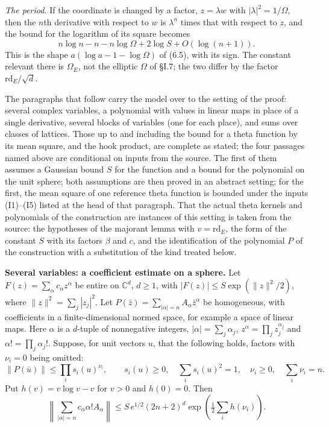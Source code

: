 \documentclass[11pt,letterpaper]{article}
\begin{document}
\emph{The period.} If the coordinate is changed by a factor, $z=\lambda w$ with $|\lambda|^2=1/\Omega$, then
the $n$th derivative with respect to $w$ is $\lambda^n$ times that with respect to $z$, and the bound for the
logarithm of its square becomes
\begin{equation}\label{D:146}
 n\log n-n-n\log\Omega+2\log S+O(\log(n+1)).
\end{equation}
This is the shape $a(\log a-1-\log\Omega)$ of (6.5), with its sign. The constant relevant there is
$\Omega_E$, not the elliptic $\Omega$ of \S I.7; the two differ by the factor $\mathrm{rd}_E/\sqrt d$.

The paragraphs that follow carry the model over to the setting of the proof: several complex variables, a
polynomial with values in linear maps in place of a single derivative, several blocks of variables (one for
each place), and sums over classes of lattices. Those up to and including the bound for a theta function by its mean square, and the hook product, are complete as stated; the four passages named above are conditional on inputs from the source. The first of them assumes a Gaussian bound $S$ for the function and a bound for
the polynomial on the unit sphere; both assumptions are then proved in an abstract setting; for the first, the mean square of one
reference theta function is bounded under the inputs (I1)--(I5) listed at the head of that paragraph. That the actual theta kernels
and polynomials of the construction are instances of this setting is taken from the source: the hypotheses
of the majorant lemma with $v=\mathrm{rd}_E$, the form of the constant $S$ with its factors $\beta$ and $c$,
and the identification of the polynomial $P$ of the construction with a substitution of the kind treated
below.

\textbf{Several variables: a coefficient estimate on a sphere.}
Let $F(z)=\sum_\alpha c_\alpha z^\alpha$ be entire on $\mathbb C^d$, $d\ge1$,
with $|F(z)|\le S\exp(\|z\|^2/2)$, where $\|z\|^2=\sum_j|z_j|^2$.
Let $P(\bar z)=\sum_{|\alpha|=n}A_\alpha\bar z^\alpha$ be homogeneous,
with coefficients in a finite-dimensional normed space, for example a space
of linear maps. Here $\alpha$ is a $d$-tuple of nonnegative integers,
$|\alpha|=\sum_j\alpha_j$, $z^\alpha=\prod_j z_j^{\alpha_j}$ and
$\alpha!=\prod_j\alpha_j!$. Suppose, for unit vectors $u$, that the following holds, factors with $\nu_i=0$ being omitted:
\begin{equation}\label{D:147}
 \|P(\bar u)\|\le\prod_i s_i(u)^{\nu_i},\qquad
 s_i(u)\ge0,\quad \sum_i s_i(u)^2=1,\quad
 \nu_i\ge0,\quad\sum_i\nu_i=n.
\end{equation}
Put $h(v)=v\log v-v$ for $v>0$ and $h(0)=0$.
Then
\begin{equation}\label{D:148}
 \left\|\sum_{|\alpha|=n}c_\alpha\alpha! A_\alpha\right\|
 \le S\, e^{1/2}(2n+2)^d
       \exp\left(\tfrac12\sum_i h(\nu_i)\right).
\end{equation}
\end{document}
